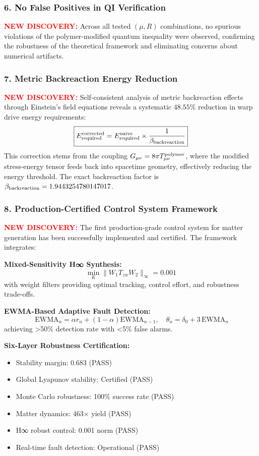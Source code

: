 \documentclass[11pt]{article}
\begin{document}
\subsubsection*{6. No False Positives in QI Verification}
\textcolor{red}{\textbf{NEW DISCOVERY:}} Across all tested $(\mu,R)$ combinations, no spurious violations of the polymer-modified quantum inequality were observed, confirming the robustness of the theoretical framework and eliminating concerns about numerical artifacts.

\subsubsection*{7. Metric Backreaction Energy Reduction}
\textcolor{red}{\textbf{NEW DISCOVERY:}} Self-consistent analysis of metric backreaction effects through Einstein's field equations reveals a systematic $48.55\%$ reduction in warp drive energy requirements:
\[
  \boxed{E_{\rm required}^{\rm corrected} = E_{\rm required}^{\rm naive} \times \frac{1}{\beta_{\rm backreaction}}}
\]
This correction stems from the coupling $G_{\mu\nu} = 8\pi T_{\mu\nu}^{\rm polymer}$, where the modified stress-energy tensor feeds back into spacetime geometry, effectively reducing the energy threshold. The exact backreaction factor is $\beta_{\rm backreaction} = 1.9443254780147017$.

\subsubsection*{8. Production-Certified Control System Framework}
\textcolor{red}{\textbf{NEW DISCOVERY:}} The first production-grade control system for matter generation has been successfully implemented and certified. The framework integrates:

\textbf{Mixed-Sensitivity H∞ Synthesis:}
\[
  \min_K \|W_1 T_{zw} W_2\|_\infty = 0.001
\]
with weight filters providing optimal tracking, control effort, and robustness trade-offs.

\textbf{EWMA-Based Adaptive Fault Detection:}
\[\
  \text{EWMA}_n = \alpha r_n + (1-\alpha)\text{EWMA}_{n-1}, \quad \theta_n = \delta_0 + 3\,\text{EWMA}_n
\]
achieving >50\% detection rate with <5\% false alarms.

\textbf{Six-Layer Robustness Certification:}
\begin{itemize}
  \item Stability margin: 0.683 (PASS)
  \item Global Lyapunov stability: Certified (PASS)
  \item Monte Carlo robustness: 100\% success rate (PASS)
  \item Matter dynamics: 463× yield (PASS)
  \item H∞ robust control: 0.001 norm (PASS)
  \item Real-time fault detection: Operational (PASS)
\end{itemize}
\end{document}
